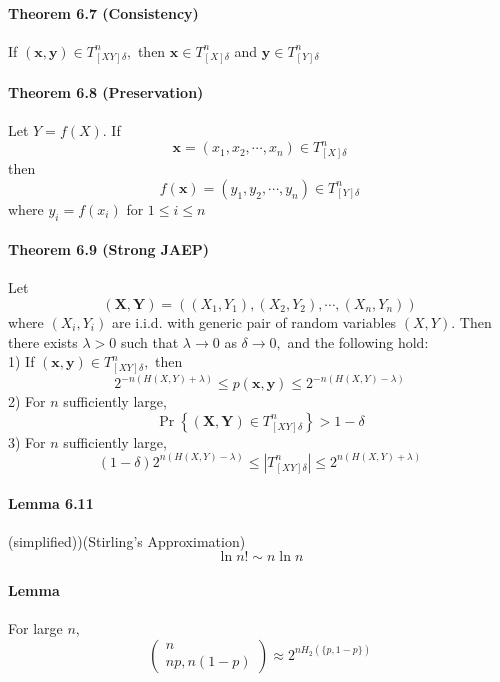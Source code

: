 \documentclass[8pt]{article}
\begin{document}
\paragraph{Theorem 6.7 (Consistency)} If $(\mathbf{x}, \mathbf{y}) \in T_{[X Y] \delta}^{n},$ then $\mathbf{x} \in T_{[X] \delta}^{n}$ and $\mathbf{y} \in T_{[Y] \delta}^{n}$

\paragraph{Theorem 6.8 (Preservation)} Let $Y=f(X)$. If
$$
\mathbf{x}=\left(x_{1}, x_{2}, \cdots, x_{n}\right) \in T_{[X] \delta}^{n}
$$
then
$$
f(\mathbf{x})=\left(y_{1}, y_{2}, \cdots, y_{n}\right) \in T_{[Y] \delta}^{n}
$$
where $y_{i}=f\left(x_{i}\right)$ for $1 \leq i \leq n$

\paragraph{Theorem 6.9 (Strong JAEP)} Let
$$
(\mathbf{X}, \mathbf{Y})=\left(\left(X_{1}, Y_{1}\right),\left(X_{2}, Y_{2}\right), \cdots,\left(X_{n}, Y_{n}\right)\right)
$$
where $\left(X_{i}, Y_{i}\right)$ are i.i.d. with generic pair of random variables $(X, Y) .$ Then there exists $\lambda>0$ such that $\lambda \rightarrow 0$ as $\delta \rightarrow 0,$ and the following hold: \\
1) If $(\mathbf{x}, \mathbf{y}) \in T_{[X Y] \delta}^{n},$ then
$$
2^{-n(H(X, Y)+\lambda)} \leq p(\mathbf{x}, \mathbf{y}) \leq 2^{-n(H(X, Y)-\lambda)}
$$
2) For $n$ sufficiently large,
$$
\operatorname{Pr}\left\{(\mathbf{X}, \mathbf{Y}) \in T_{[X Y] \delta}^{n}\right\}>1-\delta
$$
3) For $n$ sufficiently large,
$$
(1-\delta) 2^{n(H(X, Y)-\lambda)} \leq\left|T_{[X Y] \delta}^{n}\right| \leq 2^{n(H(X, Y)+\lambda)}
$$

\paragraph{Lemma 6.11} (simplified))(Stirling’s Approximation) 
$$\ln n ! \sim n \ln n$$
\paragraph{Lemma} For large $n$,
$$
\left(\begin{array}{c}
n \\
n p, n(1-p)
\end{array}\right) \approx 2^{n H_{2}(\{p, 1-p\})}
$$
\end{document}

